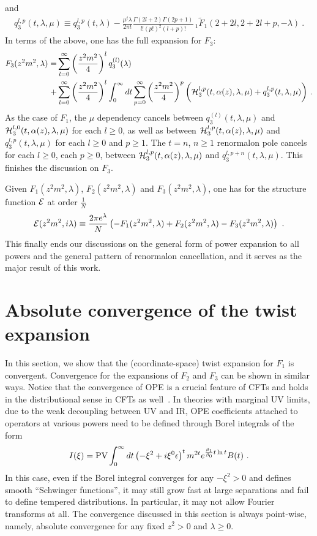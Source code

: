 \documentclass[a4paper,11pt]{article}
\begin{document}
and 
\begin{align}\label{eq:q3lpmu}
q_3^{l,p}(t,\lambda,\mu)\equiv q_3^{l,p}(t,\lambda) -\frac{\mu^t\lambda}{2\pi t}\frac{\Gamma(2l+2)\Gamma(2p+1)}{l! (p!)^2(l+p)!}\,_1\tilde F_1(2+2l,2+2l+p,-\lambda)  \ .
\end{align}
In terms of the above, one has the full expansion for $F_3$:
\begin{align}\label{eq:F3fullexpansion}
F_3(z^2m^2,\lambda)=&\sum_{l=0}^{\infty} \left(\frac{z^2m^2}{4}\right)^l q_3^{(l)}(\lambda)\nonumber \\ 
+&\sum_{l=0}^{\infty} \left(\frac{z^2m^2}{4}\right)^l\int_{0}^{\infty} dt \sum_{p=0}^{\infty}\left(\frac{z^2m^2}{4}\right)^{p}\bigg({\cal H}_3^{l,p}(t,\alpha(z),\lambda,\mu)+q_{3}^{l,p}(t,\lambda,\mu)\bigg) \ .
\end{align}
As the case of $F_1$, the $\mu$ dependency cancels between $q_3^{(l)}(t,\lambda,\mu)$ and ${\cal H}_3^{l,0}(t,\alpha(z),\lambda,\mu)$ for each $l \ge 0$, as well as between ${\cal H}_3^{l,p}(t,\alpha(z),\lambda,\mu)$ and $q_3^{l,p}(t,\lambda,\mu)$ for each $l \ge 0$ and $p\ge 1$. The $t=n$, $n\ge 1$ renormalon pole cancels for each $l \ge 0$, each $p\ge 0$, between ${\cal H}_{3}^{l,p}(t,\alpha(z),\lambda,\mu)$ and $q_3^{l,p+n}(t,\lambda,\mu)$. This finishes the discussion on $F_3$. 

Given $F_1(z^2m^2,\lambda)$, $F_2(z^2m^2,\lambda)$ and $F_3(z^2m^2,\lambda)$, one has for the structure function ${\cal E}$ at order $\frac{1}{N}$
\begin{align}
{\cal E}(z^2m^2,i\lambda)\equiv \frac{2\pi e^{\lambda}}{N}\left(-F_1(z^2m^2,\lambda)+F_2(z^2m^2,\lambda)-F_3(z^2m^2,\lambda)\right) \ .
\end{align}
This finally ends our discussions on the general form of power expansion to all powers and the general pattern of renormalon cancellation, and it serves as the major result of this work. 

\section{Absolute convergence of the twist expansion}
In this section,  we show that the (coordinate-space) twist expansion for $F_1$ is convergent. Convergence for the expansions of $F_2$ and $F_3$ can be shown in similar ways. Notice that the convergence of OPE is a crucial feature of CFTs and holds in the distributional sense in CFTs as well~\cite{Mack:1976pa}. In theories with marginal UV limits, due to the weak decoupling between UV and IR, OPE coefficients attached to operators at various powers need to be defined through Borel integrals of the form 
\begin{align}
I(\xi)={\rm PV}\int_{0}^{\infty} dt \left(-\xi^2+i\xi^0\epsilon \right)^t m^{2t} e^{\frac{\beta_1}{\beta_0}t\ln t} B(t) \ .
\end{align}
In this case, even if the Borel integral converges for any $-\xi^2>0$ and defines smooth ``Schwinger functions'', it may still grow fast at large separations and fail to define tempered distributions. In particular, it may not allow Fourier transforms at all. The convergence discussed in this section is always point-wise, namely, absolute convergence for any fixed $z^2>0$ and $\lambda \ge 0$.  
\end{document}
